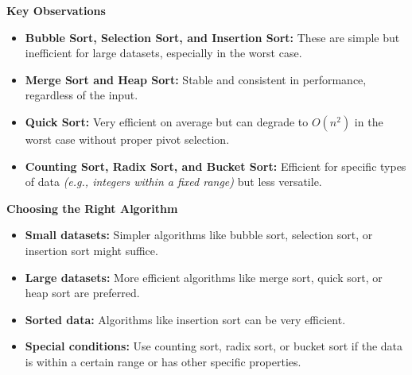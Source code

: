 \documentclass[
  letterpaper,
  DIV=11,
  numbers=noendperiod]{scrreprt}
\providecommand{\tightlist}{%
  \setlength{\itemsep}{0pt}\setlength{\parskip}{0pt}}
\begin{document}
\begin{tcolorbox}[enhanced jigsaw, colframe=quarto-callout-note-color-frame, toprule=.15mm, bottomrule=.15mm, rightrule=.15mm, colback=white, breakable, arc=.35mm, opacityback=0, left=2mm, leftrule=.75mm]

\vspace{-3mm}\textbf{Key Observations}\vspace{3mm}

\begin{itemize}
\tightlist
\item
  \textbf{Bubble Sort, Selection Sort, and Insertion Sort:} These are
  simple but inefficient for large datasets, especially in the worst
  case.
\item
  \textbf{Merge Sort and Heap Sort:} Stable and consistent in
  performance, regardless of the input.
\item
  \textbf{Quick Sort:} Very efficient on average but can degrade to
  \(O(n^2)\) in the worst case without proper pivot selection.
\item
  \textbf{Counting Sort, Radix Sort, and Bucket Sort:} Efficient for
  specific types of data \emph{(e.g., integers within a fixed range)}
  but less versatile.
\end{itemize}

\end{tcolorbox}

\begin{tcolorbox}[enhanced jigsaw, colframe=quarto-callout-note-color-frame, toprule=.15mm, bottomrule=.15mm, rightrule=.15mm, colback=white, breakable, arc=.35mm, opacityback=0, left=2mm, leftrule=.75mm]

\vspace{-3mm}\textbf{Choosing the Right Algorithm}\vspace{3mm}

\begin{itemize}
\tightlist
\item
  \textbf{Small datasets:} Simpler algorithms like bubble sort,
  selection sort, or insertion sort might suffice.
\item
  \textbf{Large datasets:} More efficient algorithms like merge sort,
  quick sort, or heap sort are preferred.
\item
  \textbf{Sorted data:} Algorithms like insertion sort can be very
  efficient.
\item
  \textbf{Special conditions:} Use counting sort, radix sort, or bucket
  sort if the data is within a certain range or has other specific
  properties.
\end{itemize}

\end{tcolorbox}
\end{document}
